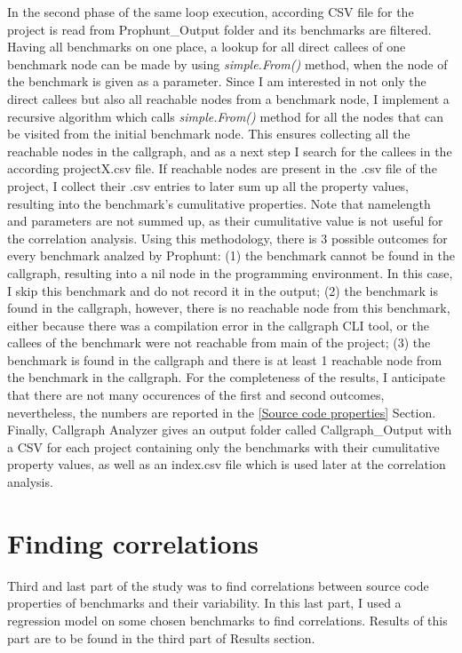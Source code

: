 \documentclass{seal_thesis}
\begin{document}
In the second phase of the same loop execution, according CSV file for the project is read from Prophunt\_Output folder and its benchmarks are filtered. Having all benchmarks on one place, a lookup for all direct callees of one benchmark node can be made by using \textit{simple.From()} method, when the node of the benchmark is given as a parameter. Since I am interested in not only the direct callees but also all reachable nodes from a benchmark node, I implement a recursive algorithm which calls \textit{simple.From()} method for all the nodes that can be visited from the initial benchmark node. This ensures collecting all the reachable nodes in the callgraph, and as a next step I search for the callees in the according projectX.csv file. If reachable nodes are present in the .csv file of the project, I collect their .csv entries to later sum up all the property values, resulting into the benchmark's cumulitative properties. Note that namelength and parameters are not summed up, as their cumulitative value is not useful for the correlation analysis. Using this methodology, there is 3 possible outcomes for every benchmark analzed by Prophunt: (1) the benchmark cannot be found in the callgraph, resulting into a nil node in the programming environment. In this case, I skip this benchmark and do not record it in the output; (2) the benchmark is found in the callgraph, however, there is no reachable node from this benchmark, either because there was a compilation error in the callgraph CLI tool, or the callees of the benchmark were not reachable from main of the project; (3) the benchmark is found in the callgraph and there is at least 1 reachable node from the benchmark in the callgraph. For the completeness of the results, I anticipate that there are not many occurences of the first and second outcomes, nevertheless, the numbers are reported in the \ref{Source code properties} Section. Finally, Callgraph Analyzer gives an output folder called Callgraph\_Output with a CSV for each project containing only the benchmarks with their cumulitative property values, as well as an index.csv file which is used later at the correlation analysis.

\section{Finding correlations}
Third and last part of the study was to find correlations between source code properties of benchmarks and their variability. In this last part, I used a regression model on some chosen benchmarks to find correlations. Results of this part are to be found in the third part of Results section.
\end{document}
